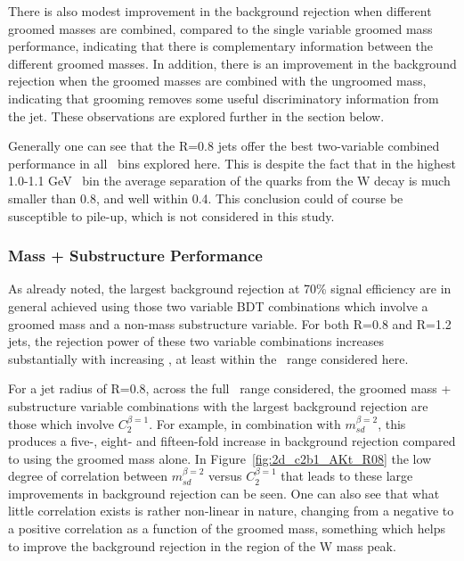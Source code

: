 
There is also modest improvement in
the background rejection when different groomed masses are combined,
compared to the single variable groomed mass performance, indicating that there is complementary information between the
different groomed masses. In addition, there is an improvement in the
background rejection when the groomed masses are combined with the
ungroomed mass, indicating that grooming removes some useful
discriminatory information from the jet. These observations are
explored further in the section below.

Generally one can see that the R=0.8 jets offer the best two-variable
combined performance in all \pt~bins explored here. This is despite
the fact that in the highest 1.0-1.1 GeV \pt~bin the average
separation of the quarks from the W decay is much smaller than 0.8,
and well within 0.4. This conclusion could of course be susceptible to
pile-up, which is not considered in this study.

\subsubsection{Mass + Substructure Performance}

As already noted, the largest background rejection at 70\% signal
efficiency are in general achieved using those two variable BDT combinations
which involve a groomed mass and a non-mass substructure variable. For
both R=0.8 and R=1.2 jets, the rejection power of these two variable
combinations increases substantially with increasing \pt, at least
within the \pt~range considered here.

For a jet radius of R=0.8, across the full \pt~range considered, the
groomed mass + substructure variable combinations with the
largest background rejection are those which
involve $C_2^{\beta=1}$. For example, in combination with
$m_{sd}^{\beta=2}$, this produces a five-, eight- and fifteen-fold
increase in background rejection compared to using the groomed mass
alone. In Figure~\ref{fig:2d_c2b1_AKt_R08} the low degree of
correlation between $m_{sd}^{\beta=2}$ versus $C_2^{\beta=1}$ that
leads to these large improvements in background rejection can be
seen. One can also see that what little correlation exists is rather
non-linear in nature, changing from a negative to a positive
correlation as a function of the groomed mass, something which helps
to improve the background rejection in the region of the W mass peak.

